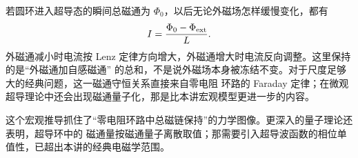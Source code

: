 若圆环进入超导态的瞬间总磁通为 $\Phi_0$，以后无论外磁场怎样缓慢变化，都有
\begin{equation}
  I=\frac{\Phi_0-\Phi_{\rm ext}}{L}.
\end{equation}
外磁通减小时电流按 Lenz 定律方向增大，外磁通增大时电流反向调整。这里保持的是“外磁通加自感磁通”
的总和，不是说外磁场本身被冻结不变。对于尺度足够大的经典问题，这一磁通守恒关系直接来自零电阻
环路的 Faraday 定律；在微观超导理论中还会出现磁通量子化，那是比本讲宏观模型更进一步的内容。

\superconductingRingDiagram

这个宏观推导抓住了“零电阻环路中总磁链保持”的力学图像。更深入的量子理论还表明，超导环中的
磁通量按磁通量子离散取值；那需要引入超导波函数的相位单值性，已超出本讲的经典电磁学范围。
